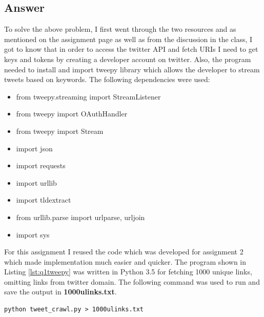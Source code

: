 \documentclass[letterpaper,11pt]{article}
\begin{document}
\subsection*{Answer}
To solve the above problem, I first went through the two resources \cite{twitterref} and \cite{twitterstreamref} as mentioned on the assignment page as well as from the discussion in the class, I got to know that in order to access the twitter API and fetch URIs I need to get keys and tokens by creating a developer account on twitter.
Also, the program needed to install and import tweepy library which allows the developer to stream tweets based on keywords. The following dependencies were used:
\begin{itemize}
  \item from tweepy.streaming import StreamListener
  \item from tweepy import OAuthHandler
  \item from tweepy import Stream
  \item import json
  \item import requests
  \item import urllib
  \item	import tldextract
  \item	from urllib.parse import urlparse, urljoin
  \item	import sys

\end{itemize}
For this assignment I reused the code which was developed for assignment 2 which made implementation much easier and quicker. The program shown in Listing \ref{lst:q1tweepy} was written in Python 3.5 for fetching 1000 unique links, omitting links from twitter domain. The following command was used to run and save the output in \textbf{1000ulinks.txt}.
\begin{lstlisting}[frame=single]
python tweet_crawl.py > 1000ulinks.txt
\end{lstlisting}
\end{document}
